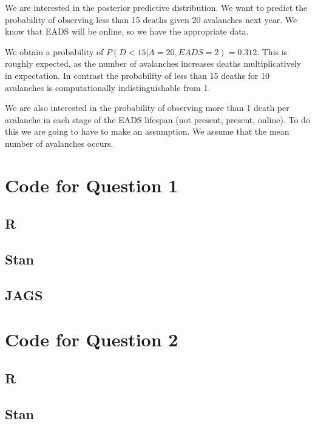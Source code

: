 \documentclass[10pt]{extarticle}
\begin{document}
We are interested in the posterior predictive distribution. We want to predict the probability of observing less than 15 deaths given 20 avalanches next year. We know that EADS will be online, so we have the appropriate data. 

We obtain a probability of $P(D<15|A=20, EADS=2) = 0.312$. This is roughly expected, as the number of avalanches increases deaths multiplicatively in expectation. In contrast the probability of less than 15 deaths for 10 avalanches is computationally indistinguishable from 1.

We are also interested in the probability of observing more than 1 death per avalanche in each stage of the EADS lifespan (not present, present, online). To do this we are going to have to make an assumption. We assume that the mean number of avalanches occurs. 

\printbibliography

\appendix

\section{Code for Question 1}
\subsection{R}
\label{code:main_1}
\subsection{Stan}
\label{code:stan_1}
\subsection{JAGS}
\label{code:jags_1}
\section{Code for Question 2}
\subsection{R}
\label{code:main_2}
\subsection{Stan}
\label{code:stan_2}
\end{document}
